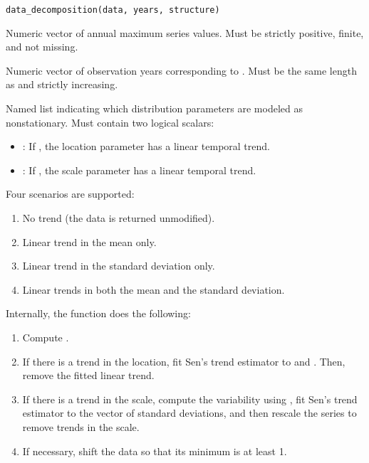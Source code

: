 \documentclass[a4paper]{book}
\begin{document}
%
\begin{Usage}
\begin{verbatim}
data_decomposition(data, years, structure)
\end{verbatim}
\end{Usage}
%
\begin{Arguments}
\begin{ldescription}
\item[\code{data}] Numeric vector of annual maximum series values.
Must be strictly positive, finite, and not missing.

\item[\code{years}] Numeric vector of observation years corresponding to .
Must be the same length as  and strictly increasing.

\item[\code{structure}] Named list indicating which distribution parameters are
modeled as nonstationary. Must contain two logical scalars:
\begin{itemize}

\item{} : If , the location parameter has a linear temporal trend.
\item{} : If , the scale parameter has a linear temporal trend.

\end{itemize}

\end{ldescription}
\end{Arguments}
%
\begin{Details}
Four scenarios are supported:
\begin{enumerate}

\item{} No trend (the data is returned unmodified).
\item{} Linear trend in the mean only.
\item{} Linear trend in the standard deviation only.
\item{} Linear trends in both the mean and the standard deviation.

\end{enumerate}


Internally, the function does the following:
\begin{enumerate}

\item{} Compute .
\item{} If there is a trend in the location, fit Sen’s trend estimator to
 and . Then, remove the fitted linear trend.
\item{} If there is a trend in the scale, compute the variability using
, fit Sen’s trend estimator to the vector of
standard deviations, and then rescale the series to remove trends
in the scale.
\item{} If necessary, shift the data so that its minimum is at least 1.

\end{enumerate}

\end{Details}
\end{document}
